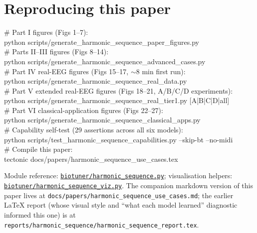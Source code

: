 \documentclass[11pt,a4paper]{article}
\begin{document}
\section{Reproducing this paper}

\begin{tcolorbox}[colback=black!4, colframe=black!30, sharp corners,
                  fontupper=\small\ttfamily, before skip=4pt, after skip=4pt]
\# Part I figures (Figs 1--7):\\
python scripts/generate\_harmonic\_sequence\_paper\_figures.py\\[2pt]
\# Parts II--III figures (Figs 8--14):\\
python scripts/generate\_harmonic\_sequence\_advanced\_cases.py\\[2pt]
\# Part IV real-EEG figures (Figs 15--17, $\sim$8 min first run):\\
python scripts/generate\_harmonic\_sequence\_real\_data.py\\[2pt]
\# Part V extended real-EEG figures (Figs 18--21, A/B/C/D experiments):\\
python scripts/generate\_harmonic\_sequence\_real\_tier1.py [A|B|C|D|all]\\[2pt]
\# Part VI classical-application figures (Figs 22--27):\\
python scripts/generate\_harmonic\_sequence\_classical\_apps.py\\[2pt]
\# Capability self-test (29 assertions across all six models):\\
python scripts/test\_harmonic\_sequence\_capabilities.py --skip-bt --no-midi\\[2pt]
\# Compile this paper:\\
tectonic docs/papers/harmonic\_sequence\_use\_cases.tex
\end{tcolorbox}

Module reference:
\href{../../biotuner/harmonic_sequence.py}{\texttt{biotuner/harmonic\_sequence.py}};
visualisation helpers:
\href{../../biotuner/harmonic_sequence_viz.py}{\texttt{biotuner/harmonic\_sequence\_viz.py}}.
The companion markdown version of this paper lives at
\texttt{docs/papers/harmonic\_sequence\_use\_cases.md}; the earlier
LaTeX report (whose visual style and ``what each model learned''
diagnostic informed this one) is at
\texttt{reports/harmonic\_sequence/harmonic\_sequence\_report.tex}.
\end{document}
